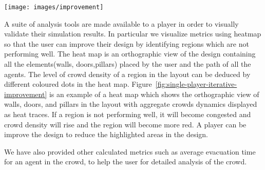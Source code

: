 \begin{figure*}
	\texttt{[image: images/improvement]}
	\caption{\label{fig:single-player-iterative-improvement}Iterative environment improvement, in terms of evacuation time, is shown from left to right. The red dots at the bottom of the environment represent the egress point. a)Time=13.34, b)Time= 11.58, c)Time=8.79, d)Time=8.11, e)Time=7.60}
\end{figure*}

A suite of analysis tools are made available to a player in order to visually validate their simulation results.  In particular we visualize metrics using heatmap so that the user can improve their design by identifying regions which are not performing well. The heat map is an orthographic view of the design containing all the elements(walls, doors,pillars) placed by the user and the path of all the agents. The level of crowd density of a region in the layout can be deduced by different coloured dots in the heat map. Figure~\ref{fig:single-player-iterative-improvement} is an example of a heat map which shows the orthographic view of walls, doors, and pillars in the layout with aggregate crowds dynamics displayed as heat traces. If a region is not performing well, it will become congested and crowd density will rise and the region will become more red. A player can be improve the design to reduce the highlighted areas in the design.

We have also provided other calculated metrics such as average evacuation time for an agent in the crowd, to help the user for detailed analysis of the crowd.

